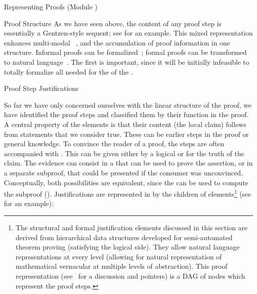 \begin{omgroup}[id=proofs,short=Representing Proofs]{Representing Proofs (Module {})}
\begin{module}[id=proof-structure]
\begin{omgroup}[id=proof-text]{Proof Structure}
As we have seen above, the content of any proof step is essentially a Gentzen-style sequent; see
{} for an example. This mixed representation enhances multi-modal
{}~\cite{Fiedler:tape97}, and the accumulation of proof
information in one structure. Informal proofs can be formalized~\cite{Baur:susmt99};
formal proofs can be transformed to natural language~\cite{HuangFiedler:pmfp96}. The first
is important, since it will be initially infeasible to totally formalize all
{} needed for the {} of the
{}.
\end{omgroup}
\end{module}

\begin{module}[id=justifications]
\begin{omgroup}[id=proofs.justifications]{Proof Step Justifications}

\begin{omtext}
  So far we have only concerned ourselves with the linear structure of the proof, we have
  identified the proof steps and classified them by their function in the proof. A central
  property of the  elements is that their content (the local claim)
  follows from statements that we consider true. These can be earlier steps in the proof
  or general knowledge. To convince the reader of a proof, the steps are often accompanied
  with .  This can be given either by a logical
  {} or {} for the truth of the
  claim.  The evidence can consist in a {} that can be used to
  prove the assertion, or in a separate subproof, that could be presented if the consumer
  was unconvinced.  Conceptually, both possibilities are equivalent, since the
  {} can be used to compute the subproof (). Justifications are represented in \omdoc by the
   children of  elements\footnote{The structural and
    formal justification elements discussed in this section are derived from hierarchical
    data structures developed for semi-automated theorem proving (satisfying the logical
    side). They allow natural language representations at every level (allowing for
    natural representation of mathematical vernacular at multiple levels of abstraction).
    This proof representation (see~\cite{BenzmuellerEtAl:otama97} for a discussion and
    pointers) is a DAG of nodes which represent the proof steps.}  (see
  {} for an example):
\end{omtext}


\end{omgroup}
\end{module}
\end{omgroup}
